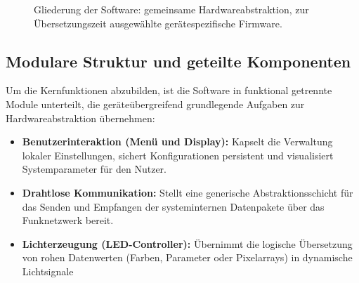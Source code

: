 \begin{figure}[H]
    \centering
    \caption{Gliederung der Software: gemeinsame Hardwareabstraktion, zur Übersetzungszeit ausgewählte gerätespezifische Firmware.}
    \label{fig:software-architektur}
\end{figure}

\subsection{Modulare Struktur und geteilte Komponenten}
\label{subsec:gemeinsame-softwarekomponenten}

Um die Kernfunktionen abzubilden, ist die Software in funktional getrennte Module unterteilt, 
die geräteübergreifend grundlegende Aufgaben zur Hardwareabstraktion übernehmen:

\begin{itemize}
    \item \textbf{Benutzerinteraktion (Menü und Display):} Kapselt die Verwaltung lokaler 
    Einstellungen, sichert Konfigurationen persistent und visualisiert Systemparameter für den Nutzer.
    \item \textbf{Drahtlose Kommunikation:} Stellt eine generische Abstraktionsschicht 
    für das Senden und Empfangen der systeminternen Datenpakete über das Funknetzwerk bereit.
    \item \textbf{Lichterzeugung (LED-Controller):} Übernimmt die logische Übersetzung von 
    rohen Datenwerten (Farben, Parameter oder Pixelarrays) in dynamische Lichtsignale
\end{itemize}

